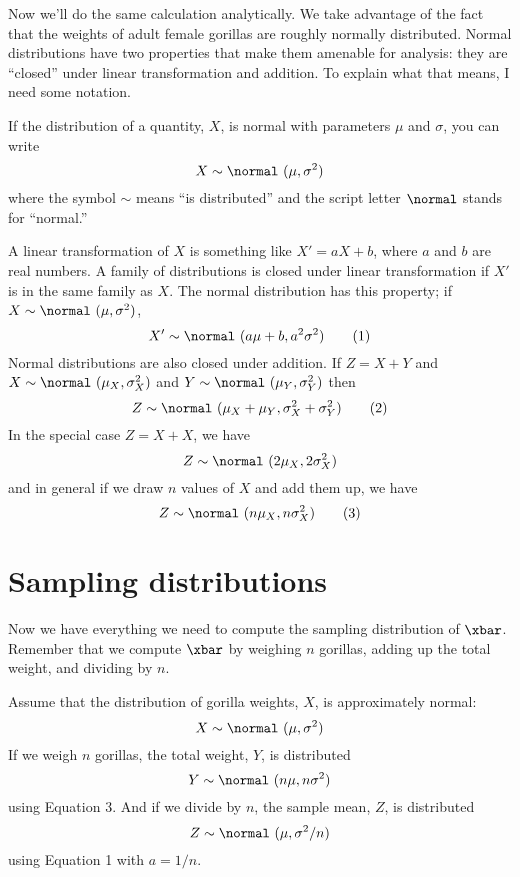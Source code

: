 Now we'll do the same calculation analytically.  We
take advantage of the fact that the weights of adult female gorillas
are roughly normally distributed.  Normal distributions have two
properties that make them amenable for analysis: they are ``closed'' under
linear transformation and addition.  To explain what that means, I
need some notation.  

If the distribution of a quantity, $X$, is
normal with parameters $\mu$ and $\sigma$, you can write
%
\[ X \sim \normal~(\mu, \sigma^{2})\]
%
where the symbol $\sim$ means ``is distributed'' and the script letter
$\normal$ stands for ``normal.''


A linear transformation of $X$ is something like $X' = a X + b$, where
$a$ and $b$ are real numbers.
A family of distributions is closed under
linear transformation if $X'$ is in the same family as $X$.  The normal
distribution has this property; if $X \sim \normal~(\mu,
\sigma^2)$,
%
\[ X' \sim \normal~(a \mu + b, a^{2} \sigma^2) \tag*{(1)} \]
%
Normal distributions are also closed under addition.  
If $Z = X + Y$ and
$X \sim \normal~(\mu_{X}, \sigma_{X}^{2})$ and
$Y \sim \normal~(\mu_{Y}, \sigma_{Y}^{2})$ then
%
\[ Z \sim \normal~(\mu_X + \mu_Y, \sigma_X^2 + \sigma_Y^2)  \tag*{(2)}\]
%
In the special case $Z = X + X$, we have
%
\[ Z \sim \normal~(2 \mu_X, 2 \sigma_X^2) \]
%
and in general if we draw $n$ values of $X$ and add them up, we have
%
\[ Z \sim \normal~(n \mu_X, n \sigma_X^2)  \tag*{(3)}\]


\section{Sampling distributions}

Now we have everything we need to compute the sampling distribution of
$\xbar$.  Remember that we compute $\xbar$ by weighing $n$ gorillas,
adding up the total weight, and dividing by $n$.

Assume that the distribution of gorilla weights, $X$, is
approximately normal:
%
\[ X \sim \normal~(\mu, \sigma^2)\]
%
If we weigh $n$ gorillas, the total weight, $Y$, is distributed
%
\[ Y \sim \normal~(n \mu, n \sigma^2) \]
%
using Equation 3.  And if we divide by $n$, the sample mean,
$Z$, is distributed
%
\[ Z \sim \normal~(\mu, \sigma^2/n) \]
%
using Equation 1 with $a = 1/n$.

